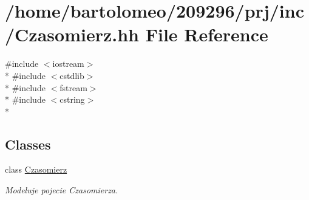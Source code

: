 \hypertarget{_czasomierz_8hh}{\section{/home/bartolomeo/209296/prj/inc/\-Czasomierz.hh File Reference}
\label{_czasomierz_8hh}
}
{\ttfamily \#include $<$iostream$>$}\\*
{\ttfamily \#include $<$cstdlib$>$}\\*
{\ttfamily \#include $<$fstream$>$}\\*
{\ttfamily \#include $<$cstring$>$}\\*
\subsection*{Classes}
\begin{DoxyCompactItemize}
\item 
class \hyperlink{class_czasomierz}{Czasomierz}
\begin{DoxyCompactList}\small\item\em Modeluje pojecie Czasomierza. \end{DoxyCompactList}\end{DoxyCompactItemize}
